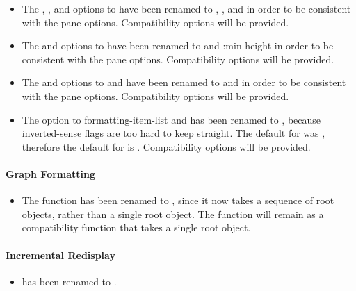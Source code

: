 \begin{itemize}
\item The , , and
 options to 
have been renamed to , , and
 in order to be consistent with the pane
options.  Compatibility options will be provided.

\item The  and  options to
 have been renamed to  and {:min-height} in
order to be consistent with the pane options.  Compatibility options will be
provided.

\item The  and  options to
 and  have been renamed to
 and  in order to be consistent with the pane
options.  Compatibility options will be provided.

\item The  option to {formatting-item-list} and
 has been renamed to , because
inverted-sense flags are too hard to keep straight.  The default for
 was , therefore the default for
 is .  Compatibility options will be
provided.
\end{itemize}


\paragraph {Graph Formatting}

\begin{itemize}
\item The function  has been renamed to
, since it now takes a sequence of root objects,
rather than a single root object.  The function  will
remain as a compatibility function that takes a single root object.
\end{itemize}


\paragraph {Incremental Redisplay}

\begin{itemize}
\item {} has been renamed to .
\end{itemize}


